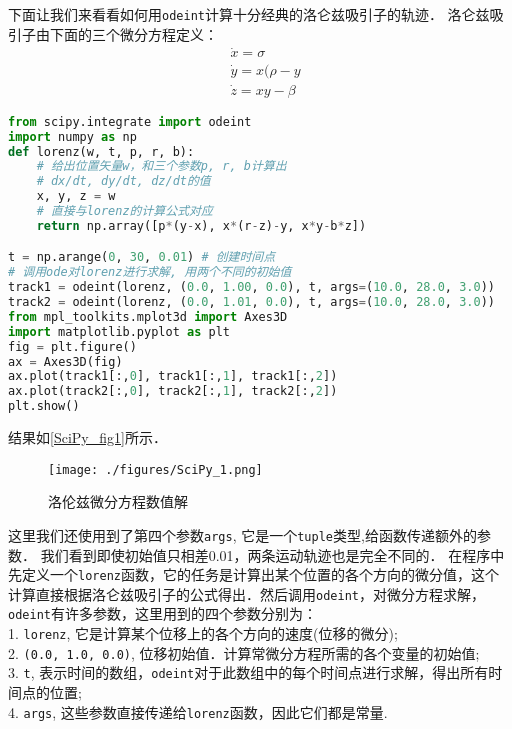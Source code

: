 下面让我们来看看如何用\verb|odeint|计算十分经典的洛仑兹吸引子的轨迹． 洛仑兹吸引子由下面的三个微分方程定义：
\begin{align}
&\dot{x}=\sigma\\
&\dot{y}=x(\rho-y\\
&\dot{z}=xy-\beta
\end{align}
\begin{lstlisting}[language=python]
from scipy.integrate import odeint
import numpy as np
def lorenz(w, t, p, r, b):
    # 给出位置矢量w，和三个参数p, r, b计算出
    # dx/dt, dy/dt, dz/dt的值
    x, y, z = w
    # 直接与lorenz的计算公式对应
    return np.array([p*(y-x), x*(r-z)-y, x*y-b*z])

t = np.arange(0, 30, 0.01) # 创建时间点
# 调用ode对lorenz进行求解, 用两个不同的初始值
track1 = odeint(lorenz, (0.0, 1.00, 0.0), t, args=(10.0, 28.0, 3.0))
track2 = odeint(lorenz, (0.0, 1.01, 0.0), t, args=(10.0, 28.0, 3.0))
from mpl_toolkits.mplot3d import Axes3D
import matplotlib.pyplot as plt
fig = plt.figure()
ax = Axes3D(fig)
ax.plot(track1[:,0], track1[:,1], track1[:,2])
ax.plot(track2[:,0], track2[:,1], track2[:,2])
plt.show()
\end{lstlisting}
结果如\autoref{SciPy_fig1}所示．
\begin{figure}[ht]
\centering
\texttt{[image: ./figures/SciPy\_1.png]}
\caption{洛伦兹微分方程数值解} \label{SciPy_fig1}
\end{figure}
这里我们还使用到了第四个参数\verb|args|, 它是一个\verb|tuple|类型,给函数传递额外的参数． 我们看到即使初始值只相差0.01，两条运动轨迹也是完全不同的．
在程序中先定义一个\verb|lorenz|函数，它的任务是计算出某个位置的各个方向的微分值，这个计算直接根据洛仑兹吸引子的公式得出．然后调用\verb|odeint|，对微分方程求解，\verb|odeint|有许多参数，这里用到的四个参数分别为：\\
1. \verb|lorenz|, 它是计算某个位移上的各个方向的速度(位移的微分);\\
2. \verb|(0.0, 1.0, 0.0)|, 位移初始值．计算常微分方程所需的各个变量的初始值;\\
3. \verb|t|, 表示时间的数组，\verb|odeint|对于此数组中的每个时间点进行求解，得出所有时间点的位置;\\
4. \verb|args|, 这些参数直接传递给\verb|lorenz|函数，因此它们都是常量.
